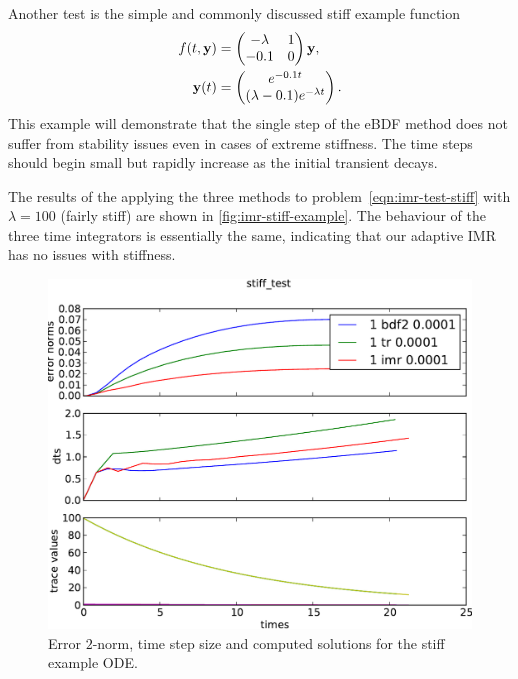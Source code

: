 Another test is the simple and commonly discussed stiff example function \cite{??ds Iserles?}
\begin{equation}
  \label{eqn:imr-test-stiff}
  \begin{aligned}
    f(t, \mathbf{y}) &= \begin{pmatrix}
     -\lambda & 1 \\
      -0.1 & 0 \\
    \end{pmatrix}   \mathbf{y}, \\
    \mathbf{y}(t) &= 
    \begin{pmatrix} e^{-0.1t} \\ (\lambda - 0.1)e^{-\lambda t} \end{pmatrix}.
  \end{aligned}
\end{equation} 
This example will demonstrate that the single step of the eBDF method does not suffer from stability issues even in cases of extreme stiffness.
The time steps should begin small but rapidly increase as the initial transient decays.

The results of the applying the three methods to problem~\eqref{eqn:imr-test-stiff} with $\lambda = 100$ (fairly stiff) are shown in \autoref{fig:imr-stiff-example}.
The behaviour of the three time integrators is essentially the same, indicating that our adaptive IMR has no issues with stiffness.

\begin{figure}[h!]
  \centering
  \includegraphics[width=1\textwidth]{aimr/stiff_test-errornormsvs-dtsvs-tracevaluesvstimes}
  \caption{Error $2$-norm, time step size and computed solutions for the stiff example ODE.}
  \label{fig:imr-stiff-example}
\end{figure}

